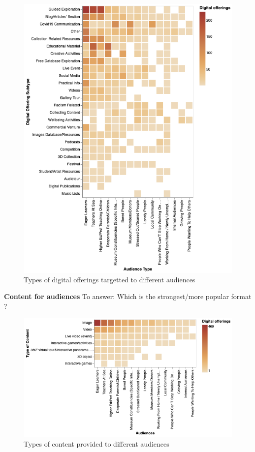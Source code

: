 \documentclass{egpubl}
\begin{document}
\begin{figure}[h]
  \centering
  \includegraphics[width=\linewidth]{images/subtypeaudience.png}
  \caption{\label{fig:DigOffType}
                      Types of digital offerings targetted to different audiences}

\end{figure}

\noindent \textbf{Content for audiences}
\color{red}To answer: Which is the strongest/more popular format ?\color{black}


\begin{figure}[h]
  \centering
  \includegraphics[width=\linewidth]{images/contentaudience.png}
  \caption{\label{fig:DigOffType}
                      Types of content provided to different audiences}

\end{figure}
\end{document}
